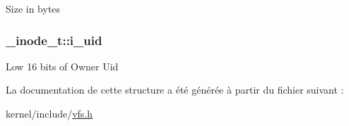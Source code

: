 Size in bytes \hypertarget{struct__inode__t_a7ddcb65050ac0b4c9cfbacd495d56f4b}{
\subsubsection[{i\-\_\-uid}]{ \-\_\-inode\-\_\-t\-::i\-\_\-uid}}\label{struct__inode__t_a7ddcb65050ac0b4c9cfbacd495d56f4b}
Low 16 bits of Owner Uid 

La documentation de cette structure a été générée à partir du fichier suivant \-:\begin{DoxyCompactItemize}
\item 
kernel/include/\hyperlink{vfs_8h}{vfs.\-h}\end{DoxyCompactItemize}
